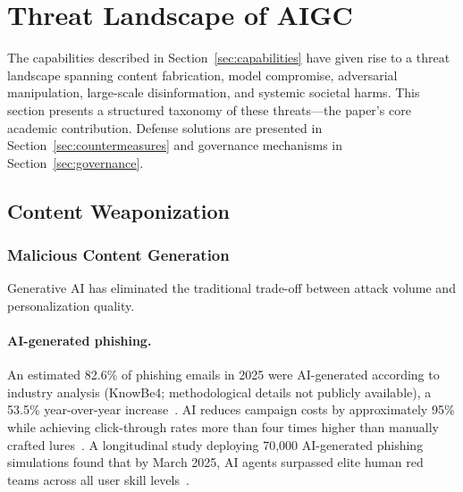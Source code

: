 
\section{Threat Landscape of AIGC}
\label{sec:threats}

The capabilities described in Section~\ref{sec:capabilities} have given rise to a threat landscape spanning content fabrication, model compromise, adversarial manipulation, large-scale disinformation, and systemic societal harms. This section presents a structured taxonomy of these threats---the paper's core academic contribution. Defense solutions are presented in Section~\ref{sec:countermeasures} and governance mechanisms in Section~\ref{sec:governance}.


\subsection{Content Weaponization}
\label{sec:threat-weapon}

\subsubsection{Malicious Content Generation}
\label{sec:threat-phishing}

Generative AI has eliminated the traditional trade-off between attack volume and personalization quality.

\paragraph{AI-generated phishing.}
An estimated 82.6\% of phishing emails in 2025 were AI-generated according to industry analysis (KnowBe4; methodological details not publicly available), a 53.5\% year-over-year increase~\cite{knowbe4_2025}. AI reduces campaign costs by approximately 95\% while achieving click-through rates more than four times higher than manually crafted lures~\cite{slashnext2025}. A longitudinal study deploying 70,000 AI-generated phishing simulations found that by March 2025, AI agents surpassed elite human red teams across all user skill levels~\cite{hoxhunt2025}.

